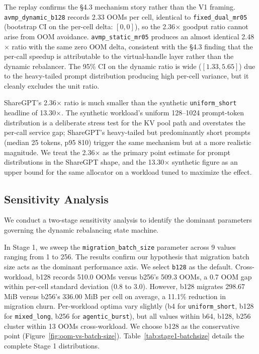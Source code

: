 The replay confirms the §4.3 mechanism story rather than the V1 framing. \texttt{avmp\_dynamic\_b128} records 2.33 OOMs per cell, identical to \texttt{fixed\_dual\_mr05} (bootstrap CI on the per-cell delta: $[0,0]$), so the 2.36$\times$ goodput ratio cannot arise from OOM avoidance. \texttt{avmp\_static\_mr05} produces an almost identical 2.48$\times$ ratio with the same zero OOM delta, consistent with the §4.3 finding that the per-call speedup is attributable to the virtual-handle layer rather than the dynamic rebalancer. The 95\% CI on the dynamic ratio is wide ($[1.33, 5.65]$) due to the heavy-tailed prompt distribution producing high per-cell variance, but it cleanly excludes the unit ratio.

ShareGPT's 2.36$\times$ ratio is much smaller than the synthetic \texttt{uniform\_short} headline of 13.30$\times$. The synthetic workload's uniform 128--1024 prompt-token distribution is a deliberate stress test for the KV pool path and overstates the per-call service gap; ShareGPT's heavy-tailed but predominantly short prompts (median 25 tokens, p95 810) trigger the same mechanism but at a more realistic magnitude. We treat the 2.36$\times$ as the primary point estimate for prompt distributions in the ShareGPT shape, and the 13.30$\times$ synthetic figure as an upper bound for the same allocator on a workload tuned to maximize the effect.

\subsection{Sensitivity Analysis}
\label{sec:eval:sensitivity}

We conduct a two-stage sensitivity analysis to identify the dominant parameters governing the dynamic rebalancing state machine.

In Stage 1, we sweep the \texttt{migration\_batch\_size} parameter across 9 values ranging from 1 to 256. The results confirm our hypothesis that migration batch size acts as the dominant performance axis. We select \texttt{b128} as the default. Cross-workload, b128 records 510.0 OOMs versus b256's 509.3 OOMs, a 0.7 OOM gap within per-cell standard deviation (0.8 to 3.0). However, b128 migrates 298.67 MiB versus b256's 336.00 MiB per cell on average, a 11.1\% reduction in migration churn. Per-workload optima vary slightly (b4 for \texttt{uniform\_short}, b128 for \texttt{mixed\_long}, b256 for \texttt{agentic\_burst}), but all values within {b64, b128, b256} cluster within 13 OOMs cross-workload. We choose b128 as the conservative point (Figure~\ref{fig:oom-vs-batch-size}). Table~\ref{tab:stage1-batchsize} details the complete Stage 1 distributions.

